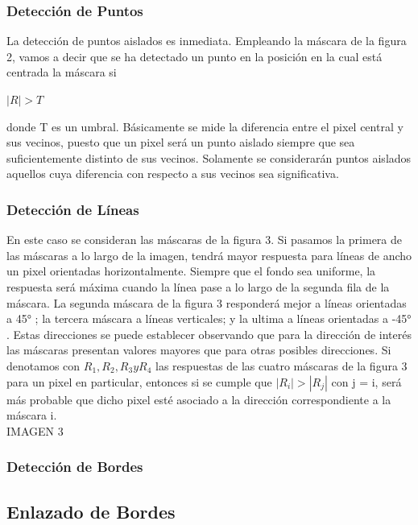 \documentclass[14pt]{article}
\begin{document}
\subsubsection{Detección de Puntos}

La detección de puntos aislados es inmediata. Empleando la máscara de la ﬁgura 2, vamos a decir que se ha detectado un punto en la posición en la cual está centrada la máscara si

\begin{center}

$ |R| > T $

\end{center}

donde T es un umbral. Básicamente se mide la diferencia entre el pixel central y sus vecinos, puesto que un pixel será un punto aislado siempre que sea suﬁcientemente distinto de sus vecinos. Solamente se considerarán puntos aislados aquellos cuya diferencia con respecto a sus vecinos sea signiﬁcativa.

\subsubsection{Detección de Líneas}

En este caso se consideran las máscaras de la ﬁgura 3. Si pasamos la primera de las máscaras a lo largo de la imagen, tendrá mayor respuesta para líneas de ancho un pixel orientadas horizontalmente. Siempre que el fondo sea uniforme, la respuesta será máxima cuando la línea pase a lo largo de la segunda ﬁla de la máscara. La segunda máscara de la ﬁgura 3 responderá mejor a líneas orientadas a 45° ; la tercera máscara a líneas verticales; y la ultima a líneas orientadas a -45° . Estas direcciones se puede establecer observando que para la dirección de interés las máscaras presentan valores mayores que para otras posibles direcciones. Si denotamos con $ R_1 , R_2 , R_3 y R_4$ las respuestas de las cuatro máscaras de la ﬁgura 3 para un pixel en particular, entonces si se cumple que $ |R_i| > |R_j |$ con j = i, será más probable que dicho pixel esté asociado a la dirección correspondiente a la máscara i.\\
IMAGEN 3

\subsubsection{Detección de Bordes}



\subsection{Enlazado de Bordes}
\end{document}
